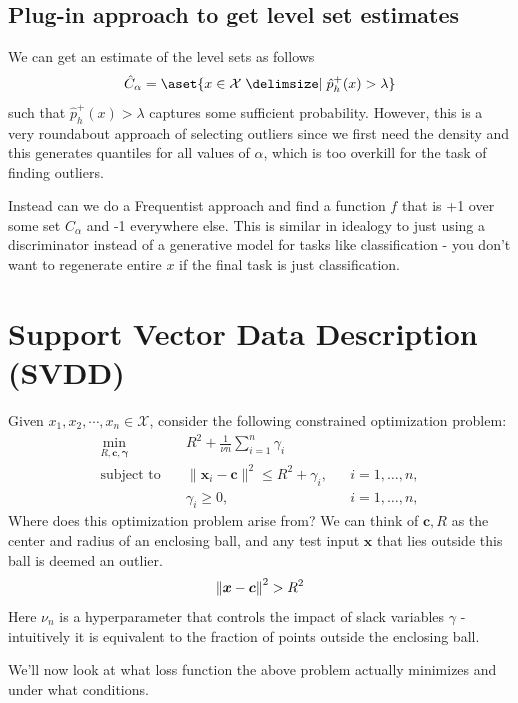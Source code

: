 \documentclass[11pt]{report}
\begin{document}
\subsection{Plug-in approach to get level set estimates}
We can get an estimate of the level sets as follows 
\begin{align}
    \hat{C}_\alpha = \aset{x \in \mathcal{X} \suchthat \hat{p}_h^+(x) > \lambda}
\end{align} such that $\hat{p}_h^+(x) > \lambda$ captures some sufficient probability. However, this is a very roundabout approach of selecting outliers since we first need the density and this generates quantiles for all values of $\alpha$, which is too overkill for the task of finding outliers. 

Instead can we do a Frequentist approach and find a function $f$ that is +1 over some set $C_\alpha$ and -1 everywhere else. This is similar in idealogy to just using a discriminator instead of a generative model for tasks like classification - you don't want to regenerate entire $x$ if the final task is just classification.

\section{Support Vector Data Description (SVDD)}
Given $x_1, x_2, \cdots, x_n \in \mathcal{X}$, consider the following constrained optimization problem:
\begin{align}
\min_{R, \mathbf{c}, \boldsymbol{\gamma}} \quad & R^2 + \frac{1}{\nu n} \sum_{i=1}^{n} \gamma_i \\
\text{subject to} \quad & \|\mathbf{x}_i - \mathbf{c} \|^2 \leq R^2 + \gamma_i, 
&& i = 1, \ldots, n, \label{svdd-const1} \\
& \gamma_i \geq 0, 
&& i = 1, \ldots, n, \label{svdd-const2}
\end{align}
 Where does this optimization problem arise from? We can think of $\boldsymbol{c}, R$ as the center and radius of an enclosing ball, and any test input $\boldsymbol{x}$ that lies outside this ball is deemed an outlier. 
$$\left\lVert \boldsymbol{x} - \boldsymbol{c} \right\rVert^2 > R^2$$
Here $\nu_n$ is a hyperparameter that controls the impact of slack variables $\gamma$ - intuitively it is equivalent to the fraction of points outside the enclosing ball. 

We'll now look at what loss function the above problem actually minimizes and under what conditions. 
\end{document}
